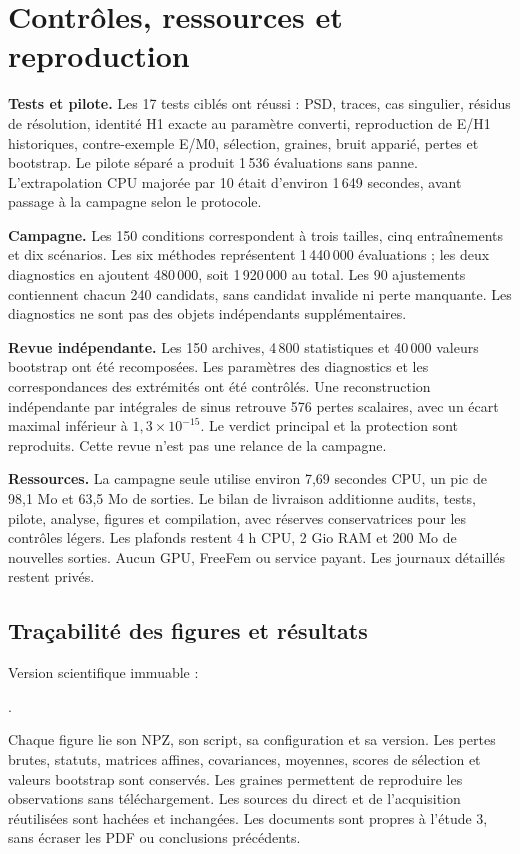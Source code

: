 \documentclass[11pt,a4paper]{article}
\begin{document}
\newpage
\section{Contrôles, ressources et reproduction}
\textbf{Tests et pilote.} Les 17 tests ciblés ont réussi : PSD, traces, cas singulier, résidus de résolution, identité H1 exacte au paramètre converti, reproduction de E/H1 historiques, contre-exemple E/M0, sélection, graines, bruit apparié, pertes et bootstrap. Le pilote séparé a produit 1\,536 évaluations sans panne. L'extrapolation CPU majorée par 10 était d'environ 1\,649 secondes, avant passage à la campagne selon le protocole.

\textbf{Campagne.} Les 150 conditions correspondent à trois tailles, cinq entraînements et dix scénarios. Les six méthodes représentent 1\,440\,000 évaluations ; les deux diagnostics en ajoutent 480\,000, soit 1\,920\,000 au total. Les 90 ajustements contiennent chacun 240 candidats, sans candidat invalide ni perte manquante. Les diagnostics ne sont pas des objets indépendants supplémentaires.

\textbf{Revue indépendante.} Les 150 archives, 4\,800 statistiques et 40\,000 valeurs bootstrap ont été recomposées. Les paramètres des diagnostics et les correspondances des extrémités ont été contrôlés. Une reconstruction indépendante par intégrales de sinus retrouve 576 pertes scalaires, avec un écart maximal inférieur à $1,3\times10^{-15}$. Le verdict principal et la protection sont reproduits. Cette revue n'est pas une relance de la campagne.

\textbf{Ressources.} La campagne seule utilise environ 7,69 secondes CPU, un pic de 98,1 Mo et 63,5 Mo de sorties. Le bilan de livraison additionne audits, tests, pilote, analyse, figures et compilation, avec réserves conservatrices pour les contrôles légers. Les plafonds restent 4 h CPU, 2 Gio RAM et 200 Mo de nouvelles sorties. Aucun GPU, FreeFem ou service payant. Les journaux détaillés restent privés.

\subsection{Traçabilité des figures et résultats}
Version scientifique immuable :\par
{\small\texttt{\DataCommit}}.

Chaque figure lie son NPZ, son script, sa configuration et sa version. Les pertes brutes, statuts, matrices affines, covariances, moyennes, scores de sélection et valeurs bootstrap sont conservés. Les graines permettent de reproduire les observations sans téléchargement. Les sources du direct et de l'acquisition réutilisées sont hachées et inchangées. Les documents sont propres à l'étude 3, sans écraser les PDF ou conclusions précédents.
\end{document}
